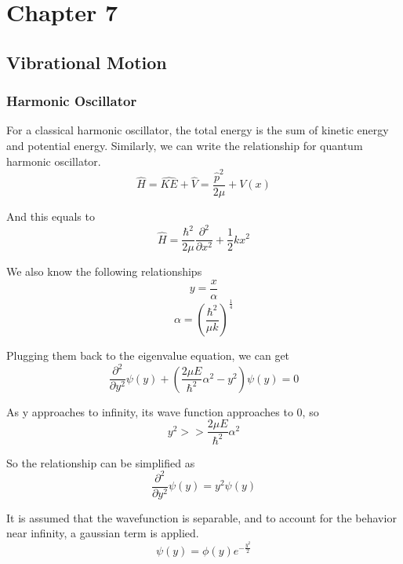 \documentclass[letterpaper]{article}
\newcommand{\pdd}[2]{\frac{\partial^2 #1}{\partial #2^2}}
\begin{document}
\newpage
\section*{Chapter 7}
\subsection*{Vibrational Motion}
\subsubsection*{Harmonic Oscillator}
For a classical harmonic oscillator, the total energy is the sum of kinetic energy
and potential energy. Similarly, we can write the relationship for quantum harmonic oscillator.
\begin{equation*}
    \hat{H}=\hat{KE}+\hat{V}=\frac{\hat{p}^2}{2\mu}+V(x)
\end{equation*}

And this equals to
\begin{equation*}
    \hat{H}=\frac{\hbar^2}{2\mu}\pdd{}{x}+\frac{1}{2}kx^2
\end{equation*}

We also know the following relationships
\begin{equation*}
    y=\frac{x}{\alpha}
\end{equation*}
\begin{equation*}
    \alpha=\left(\frac{\hbar^2}{\mu k}\right)^{\frac{1}{4}}
\end{equation*}

Plugging them back to the eigenvalue equation, we can get
\begin{equation*}
    \pdd{}{y}\psi(y)+\left(\frac{2\mu E}{\hbar^2}\alpha^2-y^2\right)\psi(y)=0
\end{equation*}

As y approaches to infinity, its wave function approaches to 0, so
\begin{equation*}
    y^2>>\frac{2\mu E}{\hbar^2}\alpha^2
\end{equation*}

So the relationship can be simplified as
\begin{equation*}
    \pdd{}{y}\psi(y)=y^2\psi(y)
\end{equation*}

It is assumed that the wavefunction is separable, and to account for the behavior near infinity,
a gaussian term is applied.
\begin{equation*}
    \psi(y)=\phi(y)e^{-\frac{y^2}{2}}
\end{equation*}
\end{document}
